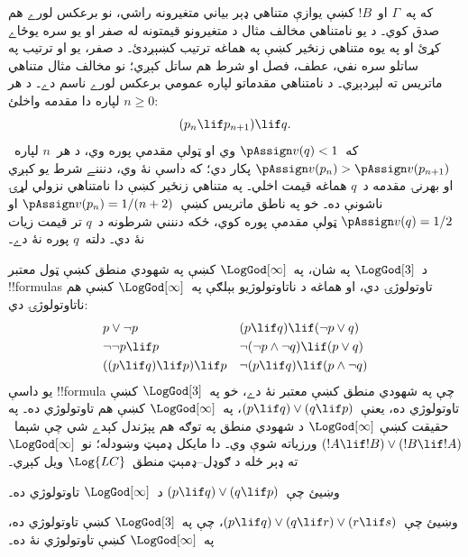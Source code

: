 \documentclass[../../../include/open-logic-section]{subfiles}
\begin{document}
که په~$\Gamma$ او~$!B$ کښې يوازې متناهي ډېر بياني متغيرونه
راشي، نو برعکس لورے هم صدق کوي۔ د يو نامتناهي مخالف مثال د
متغيرونو قيمتونه له صفر او يو سره يوځاے کړئ او په يوه متناهي
زنځير کښې په هماغه ترتيب کښېږدئ۔ د صفر، يو او ترتيب په ساتلو
سره نفي، عطف، فصل او شرط هم ساتل کېږي؛ نو مخالف مثال متناهي
ماتريس ته لېږدېږي۔
د نامتناهي مقدماتو لپاره عمومي برعکس لورے ناسم دے۔ د هر
$n\ge 0$ لپاره دا مقدمه واخلئ:
\[
(p_n \lif p_{n+1}) \lif q.
\]
که~$\pAssign v(q)<1$ وي او ټولې مقدمې پوره وي، د هر~$n$
لپاره~$\pAssign v(p_n)>\pAssign v(p_{n+1})$ پکار دي؛ که داسې
نۀ وي، دنننے شرط يو کېږي او بهرنۍ مقدمه د~$q$ هماغه قيمت
اخلي۔ په متناهي زنځير کښې دا نامتناهي نزولي لړۍ ناشونې ده۔
خو په ناطق ماتريس کښې~$\pAssign v(p_n)=1/(n+2)$ او
$\pAssign v(q)=1/2$ ټولې مقدمې پوره کوي، ځکه دننني شرطونه
د~$q$ تر قيمت زيات نۀ دي۔ دلته~$q$ پوره نۀ دے۔

د~$\LogGod[3]$ په شان، په~$\LogGod[\infty]$ کښې په شهودي منطق کښې
ټول معتبر !!{formula}s تاوتولوژۍ دي، او هماغه د ناتاوتولوژيو بېلګې
په~$\LogGod[\infty]$ کښې هم ناتاوتولوژۍ دي:
\begin{align*}
  & p \lor \lnot p && (p \lif q) \lif (\lnot p \lor q) \\
  & \lnot\lnot p \lif p && \lnot(\lnot p \land \lnot q) \lif (p \lor q) \\
  & ((p \lif q) \lif p) \lif p && \lnot(p \lif q) \lif (p \land \lnot q)
\end{align*}
يو داسې !!{formula} چې په شهودي منطق کښې معتبر نۀ دے، خو
په~$\LogGod[3]$ کښې تاوتولوژي ده، يعنې~$(p \lif q) \lor (q \lif
p)$، په~$\LogGod[\infty]$ کښې هم تاوتولوژي ده۔ په حقيقت کښې
$\LogGod[\infty]$ د شهودي منطق په توګه هم پېژندل کېدے شي چې
شېما~$(!A \lif !B) \lor (!B \lif !A)$ ورزياته شوې وي۔ دا مايکل
ډمېټ وښودله؛ نو~$\LogGod[\infty]$ ته ډېر ځله د ګوډل--ډمېټ
منطق~$\Log{LC}$ ويل کېږي۔

\begin{prob}
  وښيئ چې~$(p \lif q) \lor (q \lif p)$ د~$\LogGod[\infty]$
  تاوتولوژي ده۔
\end{prob}

\begin{prob}
  وښيئ چې~$(p \lif q) \lor (q \lif r) \lor (r \lif s)$، چې
  په~$\LogGod[3]$ کښې تاوتولوژي ده، په~$\LogGod[\infty]$
  کښې تاوتولوژي نۀ ده۔
\end{prob}
\end{document}
